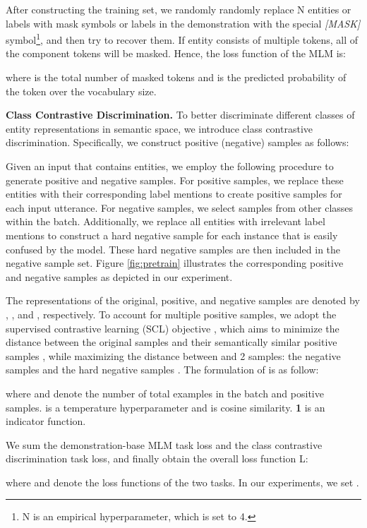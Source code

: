 \documentclass[sigconf,natbib=true,anonymous=False]{acmart}
\begin{document}
After constructing the training set, we randomly randomly replace N entities or labels with mask symbols or labels in the demonstration with the special \emph{[MASK]} symbol\footnote{N is an empirical hyperparameter, which is set to 4.}, and then try to recover them. If entity  consists of multiple tokens, all of the component tokens will be masked. Hence, the loss function of the MLM is:

where  is the total number of masked tokens and  is the predicted probability of the token  over the vocabulary size.

\textbf{Class Contrastive Discrimination.} To better discriminate different classes of entity representations in semantic space, we introduce class contrastive discrimination. Specifically, we construct positive (negative) samples as follows:

Given an input  that contains  entities, we employ the following procedure to generate positive and negative samples. For positive samples, we replace these  entities with their corresponding label mentions to create  positive samples for each input utterance. For negative samples, we select samples from other classes within the batch. Additionally, we replace all entities with irrelevant label mentions to construct a hard negative sample for each instance that is easily confused by the model. These hard negative samples are then included in the negative sample set. Figure \ref{fig:pretrain} illustrates the corresponding positive and negative samples as depicted in our experiment.

The representations of the original, positive, and negative samples are denoted by , , and , respectively. To account for multiple positive samples, we adopt the supervised contrastive learning (SCL) objective \cite{khosla2020supervised}, which aims to minimize the distance between the original samples  and their semantically similar positive samples , while maximizing the distance between   
and 2 samples: the negative samples  and the hard negative samples . The formulation of  is as follow:

where  and  denote the number of total examples in the batch and positive samples.  is a temperature hyperparameter and  is cosine similarity. \textbf{1} is an indicator function.


We sum the demonstration-base MLM task loss and the
class contrastive discrimination task loss, and finally obtain
the overall loss function L:

where  and  denote the loss functions of the two
tasks. In our experiments, we set .
\end{document}
